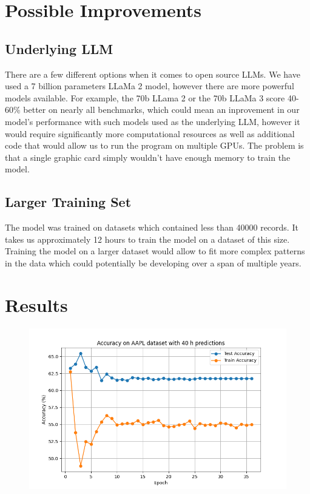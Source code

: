 \section{Possible Improvements}

\subsection{Underlying LLM}
There are a few different options when it comes to open source LLMs. We have used a 7 billion parameters LLaMa 2 model, however there are more powerful models available. For example, the 70b LLama 2 or the 70b LLaMa 3 score 40-60\% better on nearly all benchmarks, which could mean an inprovement in our model's performance with such models used as the underlying LLM, however it would require significantly more computational resources as well as additional code that would allow us to run the program on multiple GPUs. The problem is that a single graphic card simply wouldn't have enough memory to train the model.

\subsection{Larger Training Set}
The model was trained on datasets which contained less than 40000 records. It takes us approximately 12 hours to train the model on a dataset of this size. Training the model on a larger dataset would allow to fit more complex patterns in the data which could potentially be developing over a span of multiple years.

\section{Results}

\begin{figure}[h!]
  \centering
	\includegraphics[width=\linewidth]{"pictures/aapl_40h_results.png"} 
	\caption{}
	\label{fig:aapl_fig}
\end{figure}

